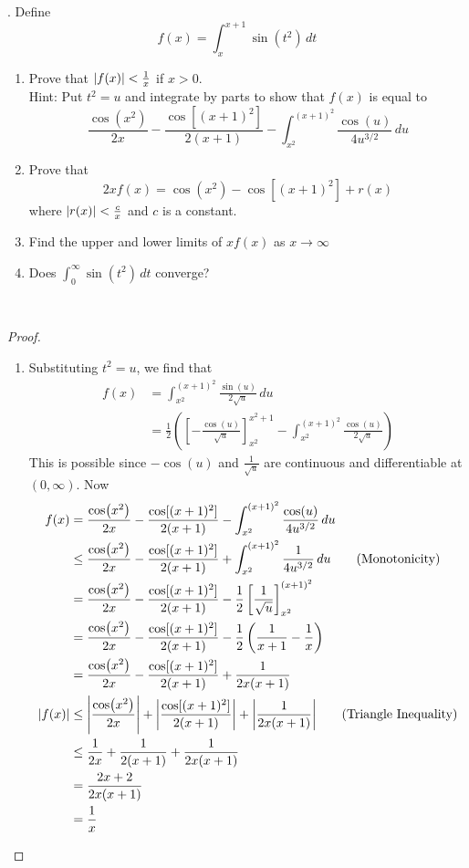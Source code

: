 \documentclass[a4paper]{article}
\begin{document}
\begin{qtn}{}{}
\thetcbcounter.\;\; Define $$f(x)=\int_x^{x+1}\sin(t^2)\,dt$$
\begin{enumerate}[label=\alph*)]
\item Prove that $\abs{f(x)}<\frac{1}{x}$ if $x>0$. \\
Hint: Put $t^2=u$ and integrate by parts to show that $f(x)$ is equal to $$\frac{\cos(x^2)}{2x}-\frac{\cos[(x+1)^2]}{2(x+1)}-\int_{x^2}^{(x+1)^2}\frac{\cos(u)}{4u^{3/2}}\,du$$
\item Prove that $$2xf(x)=\cos(x^2)-\cos[(x+1)^2]+r(x)$$ where $\abs{r(x)}<\frac{c}{x}$ and $c$ is a constant. 
\item Find the upper and lower limits of $xf(x)$ as $x\to\infty$
\item Does $\int_0^\infty\sin(t^2)\,dt$ converge?
\end{enumerate}~\\\hspace*{\fill}\cite{R0001}\tcbline
\begin{proof}~\\
\begin{enumerate}[label=\alph*)]
\item Substituting $t^2=u$, we find that 
\begin{align*}
f(x)&=\int_{x^2}^{(x+1)^2}\frac{\sin(u)}{2\sqrt{u}}\,du\\
&=\frac{1}{2}\left(\left[-\frac{\cos(u)}{\sqrt{u}}\right]_{x^2}^{x^2+1}-\int_{x^2}^{(x+1)^2}\frac{\cos(u)}{2\sqrt{u}}\right)
\end{align*}
This is possible since $-\cos(u)$ and $\frac{1}{\sqrt{u}}$ are continuous and differentiable at $(0,\infty)$. Now
\begin{align*}
f(x)&=\frac{\cos(x^2)}{2x}-\frac{\cos[(x+1)^2]}{2(x+1)}-\int_{x^2}^{(x+1)^2}\frac{\cos(u)}{4u^{3/2}}\,du\\
&\leq\frac{\cos(x^2)}{2x}-\frac{\cos[(x+1)^2]}{2(x+1)}+\int_{x^2}^{(x+1)^2}\frac{1}{4u^{3/2}}\,du\tag{Monotonicity}\\
&=\frac{\cos(x^2)}{2x}-\frac{\cos[(x+1)^2]}{2(x+1)}-\frac{1}{2}\left[\frac{1}{\sqrt{u}}\right]_{x^2}^{(x+1)^2}\\
&=\frac{\cos(x^2)}{2x}-\frac{\cos[(x+1)^2]}{2(x+1)}-\frac{1}{2}\left(\frac{1}{x+1}-\frac{1}{x}\right)\\
&=\frac{\cos(x^2)}{2x}-\frac{\cos[(x+1)^2]}{2(x+1)}+\frac{1}{2x(x+1)}\\
\abs{f(x)}&\leq\abs{\frac{\cos(x^2)}{2x}}+\abs{\frac{\cos[(x+1)^2]}{2(x+1)}}+\abs{\frac{1}{2x(x+1)}}\tag{Triangle Inequality}\\
&\leq\frac{1}{2x}+\frac{1}{2(x+1)}+\frac{1}{2x(x+1)}\\
&=\frac{2x+2}{2x(x+1)}\\
&=\frac{1}{x}
\end{align*}
\end{enumerate}
\end{proof}
\end{qtn}
\end{document}

